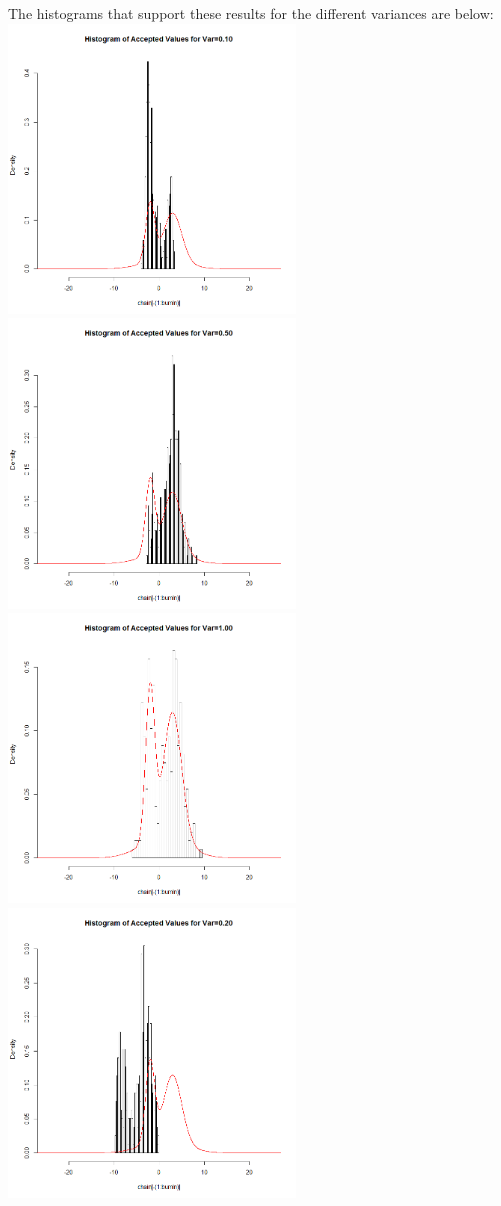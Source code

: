 \documentclass[12pt,letterpaper]{article}
\begin{document}
\begin{enumerate}[label={(\alph*) }]
        The histograms that support these results for the different variances are below: \\
        \includegraphics[width=3in]{3d_p1.png} \includegraphics[width=3in]{3d_p5.png} \\
        \includegraphics[width=3in]{3d_1.png} \includegraphics[width=3in]{3d_p2.png} \\

\end{enumerate}
\end{document}
